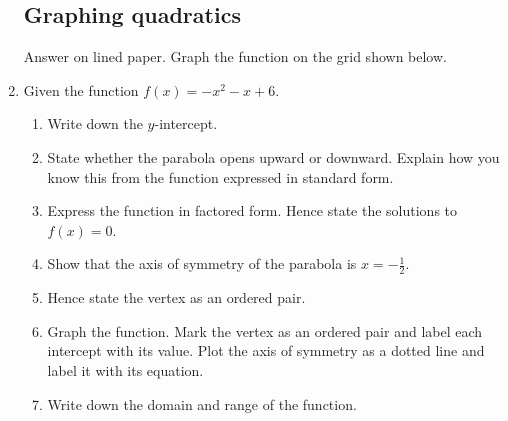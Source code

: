 \documentclass[12pt, twoside]{article}
\begin{document}
\begin{enumerate}
    \subsection*{Graphing quadratics}
    Answer on lined paper. Graph the function on the grid shown below.
    \item Given the function $f(x)=-x^2-x+6$. 
    \begin{enumerate}
        \item Write down the $y$-intercept.
        \item State whether the parabola opens upward or downward. Explain how you know this from the function expressed in standard form.
        \item Express the function in factored form. Hence state the solutions to $f(x)=0$.
        \item Show that the axis of symmetry of the parabola is $x=-\frac{1}{2}$.
        \item Hence state the vertex as an ordered pair. 
        \item Graph the function. Mark the vertex as an ordered pair and label each intercept with its value. Plot the axis of symmetry as a dotted line and label it with its equation.
        \item Write down the domain and range of the function.
    \end{enumerate}
    
    \begin{center}
      \end{center}
           
\end{enumerate}
\end{document}
